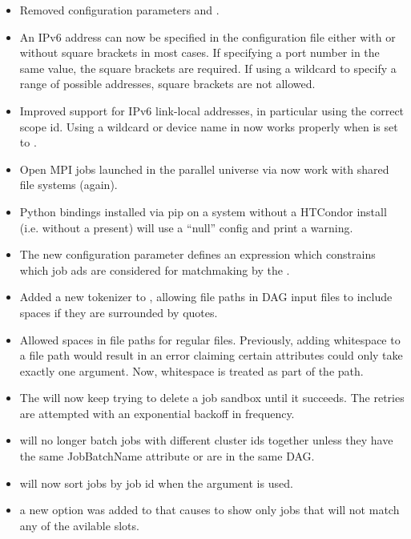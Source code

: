 \begin{itemize}
\item Removed configuration parameters 
and .

\item An IPv6 address can now be specified in the configuration file
either with or without square brackets in most cases.
If specifying a port number in the same value, the square brackets are
required.
If using a wildcard to specify a range of possible addresses, square
brackets are not allowed.

\item Improved support for IPv6 link-local addresses, in particular
using the correct scope id.
Using a wildcard or device name in  now
works properly when  is set to .

\item Open MPI jobs launched in the parallel universe via 
now work with shared file systems (again).

\item Python bindings installed via pip on a system without a
HTCondor install (i.e. without a  present)
will use a ``null'' config and print a warning.

\item The new configuration parameter 
defines an expression which constrains which job ads are considered for
matchmaking by the .

\item Added a new tokenizer to , allowing file paths in DAG input
files to include spaces if they are surrounded by quotes. 

\item Allowed spaces in file paths for regular  files.
Previously, adding whitespace to a file path would result in an error claiming
certain attributes could only take exactly one argument. Now, whitespace is 
treated as part of the path.

\item The  will now keep trying to delete a job sandbox until it succeeds.
The retries are attempted with an exponential backoff in frequency.

\item {} will no longer batch jobs with different cluster ids together unless they
have the same JobBatchName attribute or are in the same DAG.

\item {} will now sort jobs by job id when the  argument is used.

\item a new option  was added to  that causes  to show
only jobs that will not match any of the avilable slots.

\end{itemize}

